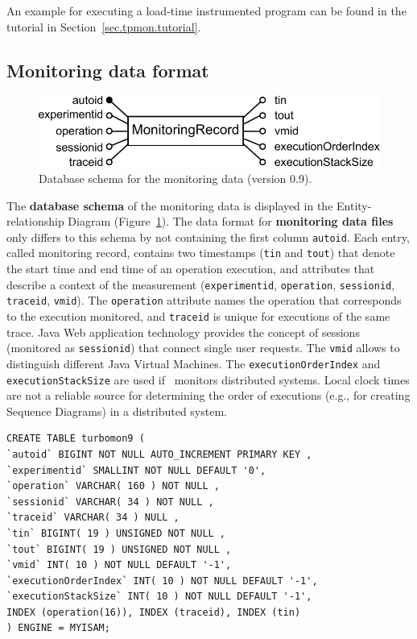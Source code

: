 \documentclass[a4paper,12pt]{scrartcl}
\begin{document}
An example for executing a load-time instrumented program can be found in the tutorial in Section~\ref{sec.tpmon.tutorial}.

\subsection{Monitoring data format}\label{sec.monitoring.data.format}

\begin{figure}
 \centering
 \includegraphics[width=0.8\columnwidth]{08-05-06-monitoringDataFormat}
 \caption{Database schema for the monitoring data (version 0.9).}
 \label{databaseSchema}
\end{figure}

The \textbf{database schema} of the monitoring data is displayed in the Entity-relationship Diagram (Figure~\ref{databaseSchema}). The data format for \textbf{monitoring data files} only differs to this schema by not containing the first column \texttt{autoid}. Each entry, called monitoring record, contains two timestamps (\texttt{tin} and \texttt{tout}) that denote the start time and end time of an operation execution, and attributes that describe a context of the measurement (\texttt{experimentid}, \texttt{operation}, \texttt{sessionid}, \texttt{traceid}, \texttt{vmid}). The \texttt{operation} attribute names the operation that corresponds to the execution monitored, and \texttt{traceid} is unique for executions of the same trace. %
 Java Web application technology provides the concept of sessions (monitored as \texttt{sessionid}) that connect single user requests. %
The \texttt{vmid} allows to distinguish different Java Virtual Machines. %
The \texttt{executionOrderIndex} and \texttt{executionStackSize} are used if \tpmon\ monitors distributed systems. Local clock times are not a reliable source for determining the order of executions (e.g., for creating Sequence Diagrams) in a distributed system.

\begin{lstlisting}[caption={SQL script for preparing the database table},label={OutputHelloWorld3}]
 CREATE TABLE turbomon9 (
`autoid` BIGINT NOT NULL AUTO_INCREMENT PRIMARY KEY ,
`experimentid` SMALLINT NOT NULL DEFAULT '0',
`operation` VARCHAR( 160 ) NOT NULL ,
`sessionid` VARCHAR( 34 ) NOT NULL ,
`traceid` VARCHAR( 34 ) NULL ,
`tin` BIGINT( 19 ) UNSIGNED NOT NULL ,
`tout` BIGINT( 19 ) UNSIGNED NOT NULL ,
`vmid` INT( 10 ) NOT NULL DEFAULT '-1',
`executionOrderIndex` INT( 10 ) NOT NULL DEFAULT '-1',
`executionStackSize` INT( 10 ) NOT NULL DEFAULT '-1',
INDEX (operation(16)), INDEX (traceid), INDEX (tin)
) ENGINE = MYISAM;
\end{lstlisting}
\end{document}
